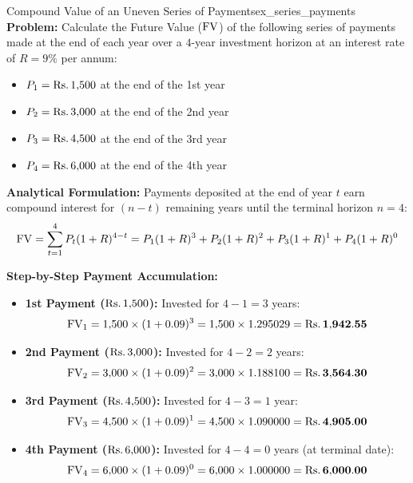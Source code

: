 \begin{example}{Compound Value of an Uneven Series of Payments}{ex_series_payments}
\textbf{Problem:}
Calculate the Future Value ($\operatorname{FV}$) of the following series of payments made at the end of each year over a $4$-year investment horizon at an interest rate of $R = 9\%$ per annum:
\begin{itemize}[noitemsep]
    \item $P_1 = \text{Rs.}\, 1{,}500$ at the end of the 1st year
    \item $P_2 = \text{Rs.}\, 3{,}000$ at the end of the 2nd year
    \item $P_3 = \text{Rs.}\, 4{,}500$ at the end of the 3rd year
    \item $P_4 = \text{Rs.}\, 6{,}000$ at the end of the 4th year
\end{itemize}

\tcbline
\textbf{Analytical Formulation:}
Payments deposited at the end of year $t$ earn compound interest for $(n - t)$ remaining years until the terminal horizon $n = 4$:
\begin{equation*}
    \operatorname{FV} = \sum_{t=1}^{4} P_t (1 + R)^{4 - t} = P_1(1+R)^3 + P_2(1+R)^2 + P_3(1+R)^1 + P_4(1+R)^0
\end{equation*}

\textbf{Step-by-Step Payment Accumulation:}
\begin{itemize}[leftmargin=*]
    \item \textbf{1st Payment ($\text{Rs.}\, 1{,}500$):} Invested for $4 - 1 = 3$ years:
    \begin{equation*}
        \operatorname{FV}_1 = 1{,}500 \times (1 + 0.09)^3 = 1{,}500 \times 1.295029 = \mathbf{\text{Rs.}\, 1{,}942.55}
    \end{equation*}

    \item \textbf{2nd Payment ($\text{Rs.}\, 3{,}000$):} Invested for $4 - 2 = 2$ years:
    \begin{equation*}
        \operatorname{FV}_2 = 3{,}000 \times (1 + 0.09)^2 = 3{,}000 \times 1.188100 = \mathbf{\text{Rs.}\, 3{,}564.30}
    \end{equation*}

    \item \textbf{3rd Payment ($\text{Rs.}\, 4{,}500$):} Invested for $4 - 3 = 1$ year:
    \begin{equation*}
        \operatorname{FV}_3 = 4{,}500 \times (1 + 0.09)^1 = 4{,}500 \times 1.090000 = \mathbf{\text{Rs.}\, 4{,}905.00}
    \end{equation*}

    \item \textbf{4th Payment ($\text{Rs.}\, 6{,}000$):} Invested for $4 - 4 = 0$ years (at terminal date):
    \begin{equation*}
        \operatorname{FV}_4 = 6{,}000 \times (1 + 0.09)^0 = 6{,}000 \times 1.000000 = \mathbf{\text{Rs.}\, 6{,}000.00}
    \end{equation*}
\end{itemize}


\end{example}
